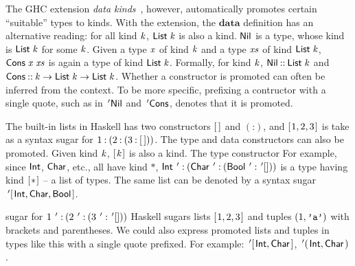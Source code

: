The GHC extension \emph{data kinds}~\cite{promotion}, however, automatically
promotes certain ``suitable'' types to kinds. With the extension, the \ensuremath{\mathbf{data}}
definition has an alternative reading: for all kind \ensuremath{\Varid{k}}, \ensuremath{\Conid{List}\;\Varid{k}} is also a
kind. \ensuremath{\Conid{Nil}} is a type, whose kind is \ensuremath{\Conid{List}\;\Varid{k}} for some \ensuremath{\Varid{k}}. Given a type \ensuremath{\Varid{x}}
of kind \ensuremath{\Varid{k}} and a type \ensuremath{\Varid{xs}} of kind \ensuremath{\Conid{List}\;\Varid{k}}, \ensuremath{\Conid{Cons}\;\Varid{x}\;\Varid{xs}} is again a type of
kind \ensuremath{\Conid{List}\;\Varid{k}}. Formally, for kind \ensuremath{\Varid{k}}, \ensuremath{\Conid{Nil}\mathbin{::}\Conid{List}\;\Varid{k}} and \ensuremath{\Conid{Cons}\mathbin{::}\Varid{k}\to \Conid{List}\;\Varid{k}\to \Conid{List}\;\Varid{k}}. Whether a constructor is promoted can often be inferred
from the context. To be more specific, prefixing a contructor with
a single quote, such as in \ensuremath{\thinspace'\Conid{Nil}} and \ensuremath{\thinspace'\Conid{Cons}}, denotes that it is promoted.

The built-in lists in Haskell has two constructors \ensuremath{[\mskip1.5mu \mskip1.5mu]} and \ensuremath{(\mathbin{:})}, and
\ensuremath{[\mskip1.5mu \mathrm{1},\mathrm{2},\mathrm{3}\mskip1.5mu]} is take as a syntax sugar for \ensuremath{\mathrm{1}\mathbin{:}(\mathrm{2}\mathbin{:}(\mathrm{3}\mathbin{:}[\mskip1.5mu \mskip1.5mu]))}. The type and
data constructors can also be promoted. Given kind \ensuremath{\Varid{k}}, \ensuremath{[\mskip1.5mu \Varid{k}\mskip1.5mu]} is also a kind.
The type constructor 
For example, since \ensuremath{\Conid{Int}}, \ensuremath{\Conid{Char}}, etc., all have kind \ensuremath{\mathbin{*}}, \ensuremath{\Conid{Int}\mathbin{\thinspace':}(\Conid{Char}\mathbin{\thinspace':}(\Conid{Bool}\mathbin{\thinspace':}\thinspace'[]))} is a type having kind \ensuremath{[\mskip1.5mu \mathbin{*}\mskip1.5mu]} -- a list of types. The same list can be denoted by a syntax
sugar \ensuremath{\thinspace'[\!\;\Conid{Int},\Conid{Char},\Conid{Bool}\;\!]}.

sugar for \ensuremath{\mathrm{1}\mathbin{\thinspace':}(\mathrm{2}\mathbin{\thinspace':}(\mathrm{3}\mathbin{\thinspace':}\thinspace'[]))}
Haskell sugars lists \ensuremath{[\mskip1.5mu \mathrm{1},\mathrm{2},\mathrm{3}\mskip1.5mu]} and tuples
 \ensuremath{(\mathrm{1},\text{\tt 'a'})} with brackets and parentheses.
 We could also express promoted lists and tuples in types like this with
 a single quote prefixed. For example:
 \ensuremath{\thinspace'[\!\;\Conid{Int},\Conid{Char}\;\!]}, \ensuremath{\thinspace'(\!\;\Conid{Int},\Conid{Char}\;\!)}.

